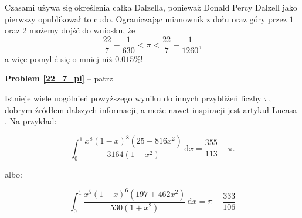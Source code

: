 Czasami używa się określenia całka Dalzella, ponieważ Donald Percy Dalzell \cite{dalzell44} jako pierwszy opublikował to cudo.
Ograniczając mianownik z dołu oraz góry przez $1$ oraz $2$ możemy dojść do wniosku, że
\begin{equation}
    \frac{22}{7} - \frac {1}{630} < \pi < \frac{22}{7} - \frac{1}{1260},
\end{equation}
a więc pomylić się o mniej niż $0.015\%$!

\textbf{Problem \ref{22_7_pi}} -- patrz \cite[s. 24]{nahin15}

Istnieje wiele uogólnień powyższego wyniku do innych przybliżeń liczby $\pi$, dobrym źródłem dalszych informacji, a może nawet inspiracji jest artykuł Lucasa \cite{lucas05}.
Na przykład:

\begin{problem}
\begin{equation}
    \int_0^1 \frac {x^8(1-x)^8 (25+816x^2)}{3164 (1+x^2)} \,\mathrm{d} x = \frac {355}{113} - \pi.
\end{equation}
\end{problem}

albo:

\begin{problem}
\begin{equation}
    \int_0^1 \frac{x^5 ( 1-x)^6 (197 + 462 x^2)}{530 (1+x^2)} \,\mathrm{d}x = \pi - \frac{333}{106}
\end{equation}
\end{problem}


%